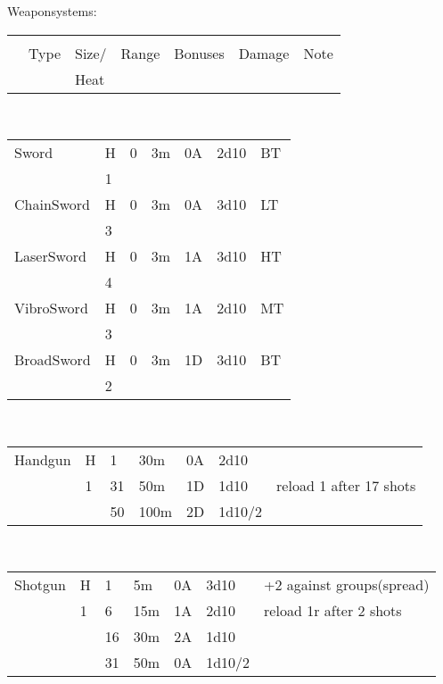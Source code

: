 \documentclass{article}
\begin{document}
Weaponsystems:\\
\begin{tabularx}{10cm}{p{0.6cm}p{0.7cm}p{0.8cm}p{1cm}p{1cm}p{3cm}p{3cm}}\\\\
&Type & Size/ & Range & Bonuses & Damage & Note\\
&&      Heat
\end{tabularx}\\
\begin{tabularx}{\textwidth}{p{2cm}p{0.4cm}p{0.5cm}@{ - }p{0.6cm}p{0.6cm}p{0.9cm}p{3cm}}\\\hline
Sword   & H & 0&3m & 0A & 2d10 & BT\\
&1\\
ChainSword   & H & 0 & 3m & 0A & 3d10  & LT\\
            &  3\\
LaserSword   & H & 0 & 3m & 1A & 3d10 & HT\\
            &4 \\
VibroSword   & H & 0&3m & 1A & 2d10 & MT\\
            &3\\
BroadSword   & H & 0&3m & 1D & 3d10 & BT\\
            &2\\
            \end{tabularx}\\
\begin{tabularx}{\textwidth}{p{2cm}p{0.4cm}p{0.5cm}@{ - }p{0.6cm}p{0.6cm}p{0.9cm}p{8cm}}\\\hline
Handgun & H    &  1 &  30m          & 0A   & 2d10\\
        &    1   & 31 &  50m        & 1D   & 1d10 & reload 1 after 17 shots\\
        &       & 50 & 100m         & 2D   & 1d10/2\\            \end{tabularx}\\ 
 \begin{tabularx}{\textwidth}{p{2cm}p{0.4cm}p{0.5cm}@{ - }p{0.6cm}p{0.6cm}p{0.9cm}p{8cm}}\\\hline
Shotgun & H    &  1 &  5m           & 0A   & 3d10& +2 against groups(spread)\\
        &    1   & 6 &  15m         & 1A   & 2d10 & reload 1r after 2 shots\\
        &       & 16 & 30m          & 2A   & 1d10\\\
        &       & 31 & 50m         & 0A   & 1d10/2\\            \end{tabularx}\\ 
\end{document}
